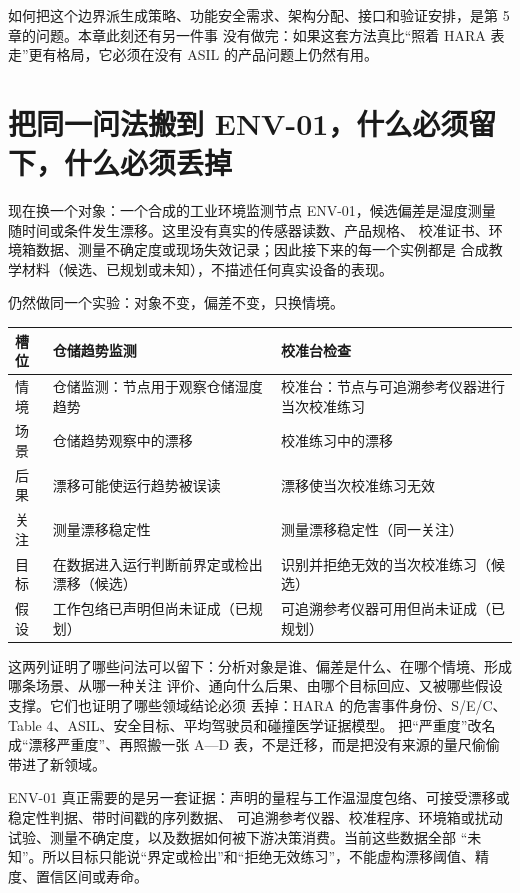 如何把这个边界派生成策略、功能安全需求、架构分配、接口和验证安排，是第 5 章的问题。本章此刻还有另一件事
没有做完：如果这套方法真比“照着 HARA 表走”更有格局，它必须在没有 ASIL 的产品问题上仍然有用。

\section{把同一问法搬到 ENV-01，什么必须留下，什么必须丢掉}

现在换一个对象：一个合成的工业环境监测节点 ENV-01，候选偏差是湿度测量
随时间或条件发生漂移。这里没有真实的传感器读数、产品规格、
校准证书、环境箱数据、测量不确定度或现场失效记录；因此接下来的每一个实例都是
合成教学材料（候选、已规划或未知），不描述任何真实设备的表现。

仍然做同一个实验：对象不变，偏差不变，只换情境。

\begin{center}
\begingroup\small
\setlength{\tabcolsep}{4pt}
\begin{tabularx}{\linewidth}{@{}XXX@{}}
\toprule
槽位 & 仓储趋势监测 & 校准台检查 \\
\midrule
情境 & 仓储监测：节点用于观察仓储湿度趋势 & 校准台：节点与可追溯参考仪器进行当次校准练习 \\
场景 & 仓储趋势观察中的漂移 & 校准练习中的漂移 \\
后果 & 漂移可能使运行趋势被误读 & 漂移使当次校准练习无效 \\
关注 & 测量漂移稳定性 & 测量漂移稳定性（同一关注） \\
目标 & 在数据进入运行判断前界定或检出漂移（候选） & 识别并拒绝无效的当次校准练习（候选） \\
假设 & 工作包络已声明但尚未证成（已规划） & 可追溯参考仪器可用但尚未证成（已规划） \\
\bottomrule
\end{tabularx}
\endgroup
\end{center}

这两列证明了哪些问法可以留下：分析对象是谁、偏差是什么、在哪个情境、形成哪条场景、从哪一种关注
评价、通向什么后果、由哪个目标回应、又被哪些假设支撑。它们也证明了哪些领域结论必须
丢掉：HARA 的危害事件身份、S/E/C、Table 4、ASIL、安全目标、平均驾驶员和碰撞医学证据模型。
把“严重度”改名成“漂移严重度”、再照搬一张 A—D 表，不是迁移，而是把没有来源的量尺偷偷带进了新领域。

ENV-01 真正需要的是另一套证据：声明的量程与工作温湿度包络、可接受漂移或稳定性判据、带时间戳的序列数据、
可追溯参考仪器、校准程序、环境箱或扰动试验、测量不确定度，以及数据如何被下游决策消费。当前这些数据全部
“未知”。所以目标只能说“界定或检出”和“拒绝无效练习”，不能虚构漂移阈值、精度、置信区间或寿命。

